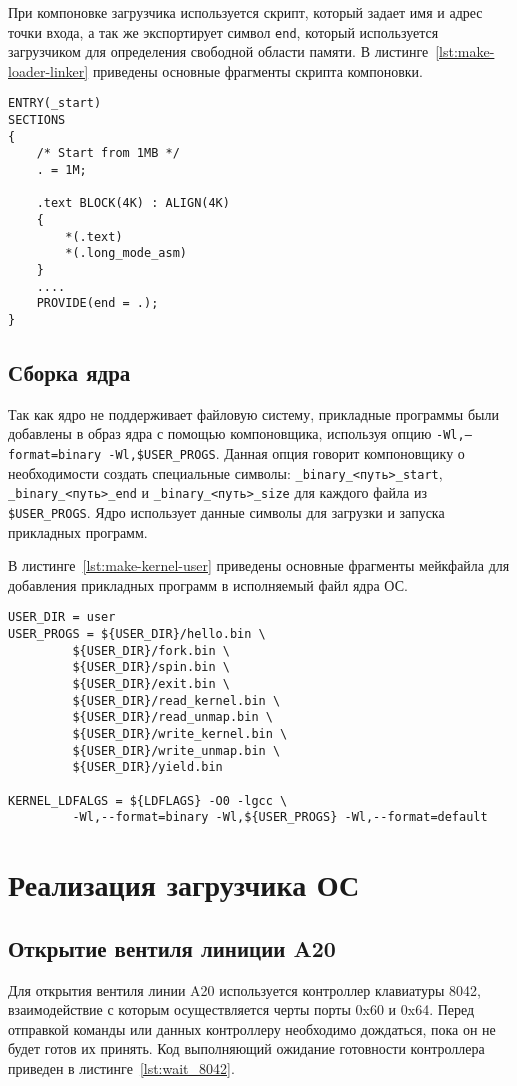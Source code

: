 При компоновке загрузчика используется скрипт, который задает имя и адрес точки входа, а так
же экспортирует символ \texttt{end}, который используется загрузчиком для определения свободной
области памяти. В листинге~\ref{lst:make-loader-linker} приведены основные фрагменты скрипта компоновки.

\begin{lstlisting}[language=Make, caption={Фрагменты скрипта компоновки}, label={lst:make-loader-linker}]
ENTRY(_start)
SECTIONS
{
	/* Start from 1MB */
	. = 1M;

	.text BLOCK(4K) : ALIGN(4K)
	{
		*(.text)
		*(.long_mode_asm)
	}
	....
	PROVIDE(end = .);
}
\end{lstlisting}


\subsection{Сборка ядра}
Так как ядро не поддерживает файловую систему, прикладные программы были добавлены в образ ядра
с помощью компоновщика, используя опцию \texttt{-Wl,--format=binary -Wl,\${USER\_PROGS}}. Данная
опция говорит компоновщику о необходимости создать специальные символы: \texttt{\_binary\_<путь>\_start},
\texttt{\_binary\_<путь>\_end} и \texttt{\_binary\_<путь>\_size} для каждого файла из \texttt{\${USER\_PROGS}}.
Ядро использует данные символы для загрузки и запуска прикладных программ.

В листинге~\ref{lst:make-kernel-user} приведены основные фрагменты мейкфайла для добавления
прикладных программ в исполняемый файл ядра ОС.

\begin{lstlisting}[language=Make, caption={Фрагмент мейкфайла для добавления бинарных файлов}, label={lst:make-kernel-user}]
USER_DIR = user
USER_PROGS = ${USER_DIR}/hello.bin \
	     ${USER_DIR}/fork.bin \
	     ${USER_DIR}/spin.bin \
	     ${USER_DIR}/exit.bin \
	     ${USER_DIR}/read_kernel.bin \
	     ${USER_DIR}/read_unmap.bin \
	     ${USER_DIR}/write_kernel.bin \
	     ${USER_DIR}/write_unmap.bin \
	     ${USER_DIR}/yield.bin

KERNEL_LDFALGS = ${LDFLAGS} -O0 -lgcc \
		 -Wl,--format=binary -Wl,${USER_PROGS} -Wl,--format=default
\end{lstlisting}

\section{Реализация загрузчика ОС}
\subsection{Открытие вентиля линиции A20}
Для открытия вентиля линии A20 используется контроллер клавиатуры 8042, взаимодействие с которым
осуществляется черты порты 0x60 и 0x64. Перед отправкой команды или данных контроллеру необходимо дождаться, пока
он не будет готов их принять. Код выполняющий ожидание готовности контроллера приведен в листинге~\ref{lst:wait_8042}.

